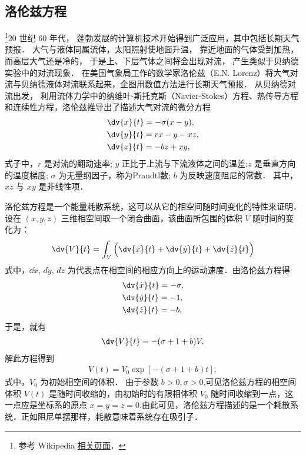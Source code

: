 

\subsection{洛伦兹方程}

\footnote{参考 Wikipedia \href{https://en.wikipedia.org/wiki/Lorenz_system}{相关页面}．}20 世纪 60 年代， 蓬勃发展的计算机技术开始得到广泛应用，其中包括长期天气预报． 大气与液体同属流体，太阳照射使地面升温， 靠近地面的气体受到加热， 而高层大气还是冷的， 于是上、下层气体之间将会出现对流， 产生类似于贝纳德实验中的对流现象． 在美国气象局工作的数学家洛伦兹（E.N. Lorenz）将大气对流与贝纳德液体对流联系起来，企图用数值方法进行长期天气预报． 从贝纳德对流出发， 利用流体力学中的纳维叶-斯托克斯（Navier-Stokes）方程、热传导方程和连续性方程，洛伦兹推导出了描述大气对流的微分方程
\begin{align}
&\dv{x}{t}=-\sigma (x-y),\\
&\dv{y}{t}=rx-y-xz,\\
&\dv{z}{t}=-bz+xy,
\end{align}
式子中，$r$ 是对流的翻动速率; $y$ 正比于上流与下流液体之间的温差;$z$ 是垂直方向的温度梯度; $\sigma$ 为无量纲因子，称为Prandtl数; $b$ 为反映速度阻尼的常数． 其中，$xz$ 与 $xy$ 是非线性项．

洛伦兹方程是一个能量耗散系统，这可以从它的相空间随时间变化的特性来证明．设在 $(x,y, z)$ 三维相空间取一个闭合曲面，该曲面所包围的体积 $V$ 随时间的变化为：
\begin{align}
\dv{V}{t}=\int_V \Big(\dv{\dot{x}}{t}+\dv{\dot{y}}{t}+\dv{\dot{z}}{t}\Big)
\end{align}
式中，$\dd{\dot{x}}$, $d\dot{y}$, $d\dot{z}$ 为代表点在相空间的相应方向上的运动速度．由洛伦兹方程得
\begin{align}
&\dv{\dot{x}}{t}=-\sigma,\\
&\dv{\dot{y}}{t}=-1,\\
&\dv{\dot{z}}{t}=-b,
\end{align}
于是，就有
\begin{align}
\dv{V}{t}=-(\sigma+1+b)V.
\end{align}
解此方程得到
\begin{align}
V(t)=V_0\exp[-(\sigma+1+b)t],
\end{align}
式中，$V_0$ 为初始相空间的体积． 由于参数 $b>0,\sigma>0$,可见洛伦兹方程的相空间体积 $V(t)$ 是随时间收缩的，由初始时的有限相体积 $V_0$ 随时间收缩到一点，这一点应是坐标系的原点 $x=y=z=0$.由此可见，洛伦兹方程描述的是一个耗散系统．正如阻尼单摆那样，耗散意味着系统存在吸引子．

